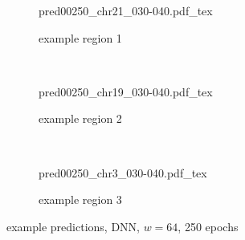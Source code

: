 \begin{figure}[p] %
    \begin{subfigure}{\textwidth}
        \centering
        \scriptsize
        {pred00250_chr21_030-040.pdf_tex}
        \caption{example  region 1} \label{fig:results:DNN64_r1}
    \end{subfigure}\\[6mm]
    \begin{subfigure}{\textwidth}
        \centering
        \scriptsize
        {pred00250_chr19_030-040.pdf_tex}
        \caption{example region 2} \label{fig:results:DNN64_r2}
    \end{subfigure}\\[6mm]
    \begin{subfigure}{\textwidth}
        \centering
        \scriptsize
        {pred00250_chr3_030-040.pdf_tex}
        \caption{example region 3} \label{fig:results:DNN64_r3}
    \end{subfigure}
    \caption{example predictions, DNN, $w=64$, 250 epochs} \label{fig:results:DNN_matrices}
\end{figure}
